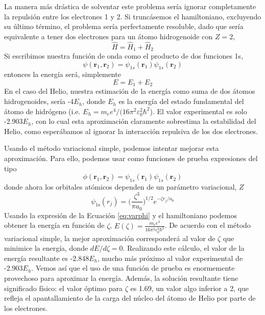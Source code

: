 \documentclass{tufte-handout}
\begin{document}
La manera más drástica de solventar este problema 
sería ignorar completamente la repulsión entre los electrones
1 y 2. Si truncásemos el hamiltoniano, excluyendo su último
término, el problema sería perfectamente resoluble, dado
que sería equivalente a tener dos electrones para un átomo
hidrogenoide con $Z=2$,
\begin{equation}
\hat{H} = \hat{H}_1+ \hat{H}_2
\end{equation}
Si escribimos nuestra función de onda como
el producto de dos funciones 1s,
\begin{equation}
    \psi(\mathbf{r}_1, \mathbf{r}_2)=\psi_{1s}(\mathbf{r}_1)\psi_{1s}(\mathbf{r}_2)
\end{equation}
entonces la energía será, simplemente
\begin{equation}
    E = E_1 + E_2 
\end{equation}
En el caso del Helio, nuestra estimación de la energía
como suma de dos átomos hidrogenoides, sería -4$E_h$, 
donde $E_h$ es la energía del estado fundamental
del átomo de hidrógeno (i.e.
$E_h=m_ee^4/(16\pi^2\varepsilon_0^2\hbar^2$). El valor 
experimental es solo -2.903$E_h$, con lo cual esta aproximación
claramente sobrestima la estabilidad del Helio, como
esperábamos al ignorar la interacción repulsiva
de los dos electrones.

Usando el método variacional simple, podemos intentar mejorar 
esta aproximación. Para ello, podemos usar como funciones
de prueba expresiones del tipo
\begin{equation}
    \phi(\mathbf{r}_1, \mathbf{r}_2)=\psi_{1s}(\mathbf{r}_1)\psi_{1s}(\mathbf{r}_2)
    \label{eq:varphi}
\end{equation}
donde ahora los orbitales atómicos dependen de un 
parámetro variacional, $Z$
\begin{equation}
    \psi_\mathrm{1s}(r_j)=\bigg(\frac{\zeta^3}{\pi a_0}\bigg)^{1/2}e^{-\zeta r_j/a_0}
\end{equation}
Usando la expresión de la Ecuación \ref{eq:varphi} y el 
hamiltoniano podemos obtener la energía en función de $\zeta$,
$E(\zeta)=\frac{m_ee^4}{16\pi^2\epsilon_0^2\hbar^2}$.
De acuerdo con el método variacional simple, la mejor aproximación
corresponderá al valor de $\zeta$ que minimice la energía, donde
$dE/d\zeta=0$. Realizando este cálculo, el valor de la energía
resultante es -2.848$E_h$, mucho más próximo al valor 
experimental de -2.903$E_h$. Vemos así que el uso de una
función de prueba es enormemente provechoso para aproximar
la energía. Además, la solución resultante tiene significado
físico: el valor óptimo para $\zeta$ es 1.69, un valor algo
inferior a 2, que refleja el apantallamiento de la carga del
núcleo del átomo de Helio por parte de los electrones. 
\end{document}
